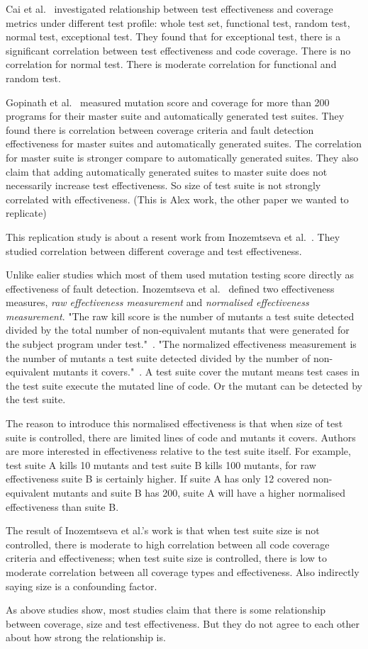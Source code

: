 Cai et al.~\cite{cai2005effect} investigated relationship between test effectiveness and coverage metrics under different test profile: whole test set, functional test, random test, normal test, exceptional test. They found that for exceptional test, there is a significant correlation between test effectiveness and code coverage. There is no correlation for normal test. There is moderate correlation for functional and random test.

Gopinath et al.~\cite{gopinath2014code} measured mutation score and coverage for more than 200 programs for their master suite and automatically generated test suites. They found there is correlation between coverage criteria and fault detection effectiveness for master suites and automatically generated suites. The correlation for master suite is stronger compare to automatically generated suites. They also claim that adding automatically generated suites to master suite does not necessarily increase test effectiveness. So size of test suite is not strongly correlated with effectiveness. (This is Alex work, the other paper we wanted to replicate)

This replication study is about a resent work from Inozemtseva et al.~\cite{inozemtseva2014coverage}. They studied correlation between different coverage and test effectiveness.

Unlike ealier studies which most of them used mutation testing score directly as effectiveness of fault detection. Inozemtseva et al.~\cite{inozemtseva2014coverage} defined two effectiveness measures, \textit{raw effectiveness measurement} and \textit{normalised effectiveness measurement}. "The raw kill score is the number of mutants a test suite detected divided by the total number of
non-equivalent mutants that were generated for the subject program under test."~\cite{inozemtseva2014coverage}. "The normalized effectiveness measurement is the number of mutants a test suite detected divided by the number of non-equivalent mutants it covers."~\cite{inozemtseva2014coverage}. A test suite cover the mutant means test cases in the test suite execute the mutated line of code. Or the mutant can be detected by the test suite. 

The reason to introduce this normalised effectiveness is that when size of test suite is controlled, there are limited lines of code and mutants it covers. Authors are more interested in effectiveness relative to the test suite itself. For example, test suite A kills 10 mutants and test suite B kills 100 mutants, for raw effectiveness suite B is certainly higher. If suite A has only 12 covered non-equivalent mutants and suite B has 200, suite A will have a higher normalised effectiveness than suite B.

The result of Inozemtseva et al.'s work is that when test suite size is not controlled, there is moderate to high correlation between all code coverage criteria and effectiveness; when test suite size is controlled, there is low to moderate correlation between all coverage types and effectiveness. Also indirectly saying size is a confounding factor.

As above studies show, most studies claim that there is some relationship between coverage, size and test effectiveness. But they do not agree to each other about how strong the relationship is.